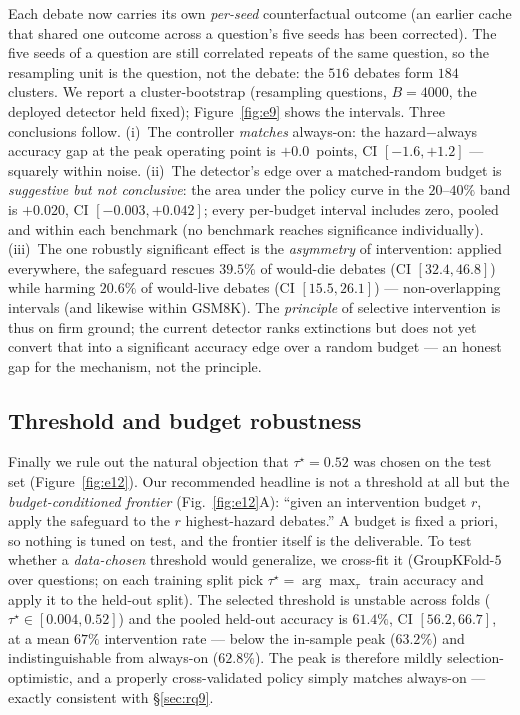 Each debate now carries its own \emph{per-seed} counterfactual outcome (an earlier cache
that shared one outcome across a question's five seeds has been corrected). The five
seeds of a question are still correlated repeats of the same question, so the resampling
unit is the question, not the debate: the $516$ debates form $184$ clusters. We report a
cluster-bootstrap (resampling questions, $B=4000$, the deployed detector held fixed);
Figure~\ref{fig:e9} shows the intervals. Three conclusions follow. (i)~The controller
\emph{matches} always-on: the hazard$-$always accuracy gap at the peak operating point is
$+0.0$~points, CI $[-1.6,+1.2]$ --- squarely within noise. (ii)~The detector's edge over
a matched-random budget is \emph{suggestive but not conclusive}: the area under the
policy curve in the $20$--$40\%$ band is $+0.020$, CI $[-0.003,+0.042]$; every per-budget
interval includes zero, pooled and within each benchmark (no benchmark reaches
significance individually). (iii)~The one robustly significant effect is the
\emph{asymmetry} of intervention: applied everywhere, the safeguard rescues $39.5\%$ of
would-die debates (CI $[32.4,46.8]$) while harming $20.6\%$ of would-live debates
(CI $[15.5,26.1]$) --- non-overlapping intervals (and likewise within GSM8K). The
\emph{principle} of selective intervention is thus on firm ground; the current detector
ranks extinctions but does not yet convert that into a significant accuracy edge over a
random budget --- an honest gap for the mechanism, not the principle.

\subsection{Threshold and budget robustness}
\label{sec:rq12}

Finally we rule out the natural objection that $\tau^\star=0.52$ was chosen on the test
set (Figure~\ref{fig:e12}). Our recommended headline is not a threshold at all but the
\emph{budget-conditioned frontier} (Fig.~\ref{fig:e12}A): ``given an intervention budget
$r$, apply the safeguard to the $r$ highest-hazard debates.'' A budget is fixed a priori,
so nothing is tuned on test, and the frontier itself is the deliverable. To test whether
a \emph{data-chosen} threshold would generalize, we cross-fit it (GroupKFold-$5$ over
questions; on each training split pick $\tau^\star=\arg\max_\tau$ train accuracy and apply
it to the held-out split). The selected threshold is unstable across folds
($\tau^\star\in[0.004,0.52]$) and the pooled held-out accuracy is $61.4\%$,
CI $[56.2,66.7]$, at a mean $67\%$ intervention rate --- below the in-sample peak
($63.2\%$) and indistinguishable from always-on ($62.8\%$). The peak is therefore mildly
selection-optimistic, and a properly cross-validated policy simply matches always-on ---
exactly consistent with \S\ref{sec:rq9}.

